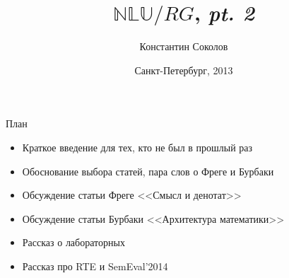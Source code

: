 \documentclass{beamer}
\begin{document}
\title{\huge{$\mathbb{NLU}/RG$, \textit{pt. 2}}}
\author{Константин Соколов}
\date{Санкт-Петербург, 2013} 
\begin{frame}
\thispagestyle{empty}
\titlepage
\end{frame}

% 
%
% 
% 
% 
% 
% 
% 
% 
% 
% 



\begin{frame}{План}
\setcounter{framenumber}{1}
\begin{itemize}
  \item Краткое введение для тех, кто не был в прошлый раз
  \item Обоснование выбора статей, пара слов о Фреге и Бурбаки
  \item Обсуждение статьи Фреге <<Смысл и денотат>>
  \item Обсуждение статьи Бурбаки <<Архитектура математики>>
  \item Рассказ о лабораторных
  \item Рассказ про RTE и SemEval'2014
\end{itemize}
\end{frame}
\end{document}
